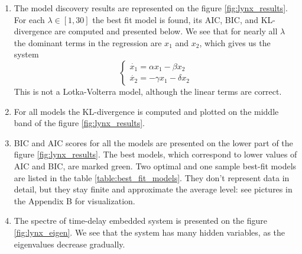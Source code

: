 \documentclass{article}
\begin{document}
    \begin{enumerate}
        \item The model discovery results are represented on the figure \ref{fig:lynx_results}. For each $\lambda \in [1, 30]$ the best fit model is found, its AIC, BIC, and KL-divergence are computed and presented below. We see that for nearly all $\lambda$ the dominant terms in the regression are $x_1$ and $x_2$, which gives us the system 
            \[
                \begin{cases}
                    \dot{x_1} = \alpha x_1 - \beta x_2 \\
                    \dot{x_2} = -\gamma x_1 - \delta x_2
                \end{cases}
            \]
            This is not a Lotka-Volterra model, although the linear terms are correct. 
        \item For all models the KL-divergence is computed and plotted on the middle band of the figure \ref{fig:lynx_results}.
        \item BIC and AIC scores for all the models are presented on the lower part of the figure \ref{fig:lynx_results}. The best models, which correspond to lower values of AIC and BIC, are marked green. Two optimal and one sample best-fit models are listed in the table \ref{table:best_fit_models}. They don't represent data in detail, but they stay finite and approximate the average level: see pictures in the Appendix B for visualization.
        \item The spectre of time-delay embedded system is presented on the figure \ref{fig:lynx_eigen}. We see that the system has many hidden variables, as the eigenvalues decrease gradually. 
    \end{enumerate}
    
\end{document}
